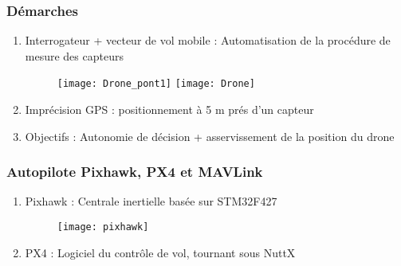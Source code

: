 \documentclass{beamer}
\begin{document}
\begin{frame}
\frametitle{D\'emarches}

\begin{enumerate}

\item Interrogateur  + vecteur de vol mobile : Automatisation de la proc\'edure de mesure des capteurs
	\begin{figure}
	
		\texttt{[image: Drone\_pont1]}
		\texttt{[image: Drone]}

	\end{figure}

\item Impr\'ecision GPS : positionnement \`a 5 m pr\'es d'un capteur
\item Objectifs : Autonomie de d\'ecision + asservissement de la position du drone

\end{enumerate}

\end{frame}


\begin{frame}
\frametitle{Autopilote Pixhawk, PX4 et MAVLink}

\begin{enumerate}

\item Pixhawk : Centrale inertielle bas\'ee sur STM32F427
	\begin{figure}
	
		\texttt{[image: pixhawk]}
	
	\end{figure}
\item PX4 : Logiciel du contr\^ole de vol, tournant sous NuttX

\end{enumerate}

\end{frame}

\end{document}
